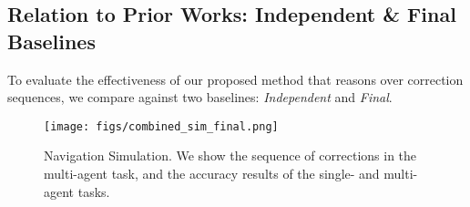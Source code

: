 
\subsection{Relation to Prior Works: Independent \& Final Baselines}
To evaluate the effectiveness of our proposed method that reasons over correction sequences, we compare against two baselines: \emph{Independent} and \emph{Final}. 


\begin{figure*}[th!]
	\begin{center}
		\texttt{[image: figs/combined\_sim\_final.png]}
\vspace{-1em}
		\caption{Navigation Simulation. We show the sequence of corrections in the multi-agent task, and the accuracy results of the single- and multi-agent tasks.}

		\label{fig:results_navi}
	\end{center}
	
	\vspace{-2em}
\end{figure*}

